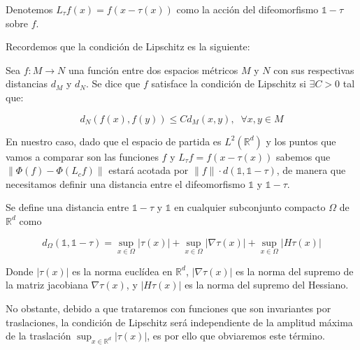 \begin{definicion}
Denotemos $L_{\tau} f(x)=f(x-\tau(x))$ como la acción del difeomorfismo $\mathbb{1}-\tau$ sobre $f$.
\end{definicion} 

\medskip

\noindent Recordemos que la condición de Lipschitz es la siguiente: 

\begin{definicion}
  Sea $f: M \rightarrow N$ una función entre dos espacios métricos $M$ y $N$ con sus respectivas distancias $d_M$ y $d_N$. Se dice que $f$ satisface la condición de Lipschitz si $\exists C>0$ tal que: 

  $$d_N(f(x),f(y))\leq C d_M(x,y), \; \; \forall x,y \in M$$
\end{definicion}

\noindent En nuestro caso, dado que el espacio de partida es $L^2(\mathbb{R}^d)$ y los puntos que vamos a comparar son las funciones $f$ y $L_\tau f=f(x-\tau(x))$ sabemos que $\|\Phi(f) - \Phi(L_cf) \|$ estará acotada por $\|f\| · d(\mathbb{1}, \mathbb{1}-\tau)$, de manera que necesitamos definir una distancia entre el difeomorfismo $\mathbb{1}$ y $\mathbb{1}-\tau$. 

\begin{definicion}
Se define una distancia entre $\mathbb{1}-\tau$ y $\mathbb{1}$ en cualquier subconjunto compacto $\Omega$ de $\mathbb{R}^d$ como 

\begin{equation} \label{eq::distancia}
  d_\Omega(\mathbb{1},\mathbb{1}-\tau) = \sup_{x \in \Omega} |\tau (x)| + \sup_{x \in \Omega} |\nabla \tau (x)| + \sup_{x \in \Omega}|H \tau (x)|
\end{equation}

\end{definicion}
\medskip

\noindent Donde $|\tau (x)|$ es la norma euclídea en $\mathbb{R}^d$, $|\nabla \tau (x)|$ es la norma del supremo de la matriz jacobiana $\nabla \tau (x)$, y $|H \tau (x)|$ es la norma del supremo del Hessiano.

\medskip

\noindent No obstante, debido a que trataremos con funciones que son invariantes por traslaciones, la condición de Lipschitz será independiente de la amplitud máxima de la traslación $\sup_{x \in \mathbb{R}^d}|\tau (x)|$, es por ello que obviaremos este término. 

\medskip


